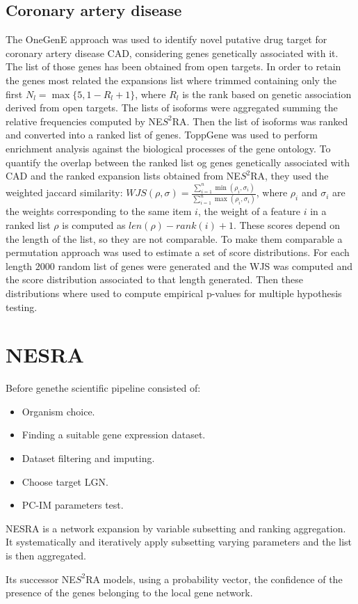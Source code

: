 	\subsection{Coronary artery disease}
	The OneGenE approach was used to identify novel putative drug target for coronary artery disease CAD, considering genes genetically associated with it.
	The list of those genes has been obtained from open targets.
	In order to retain the genes most related the expansions list where trimmed containing only the first $N_l=\max\{5, 1-R_l+1\}$, where $R_l$ is the rank based on genetic association derived from open targets.
	The lists of isoforms were aggregated summing the relative frequencies computed by NE$S^2$RA.
	Then the list of isoforms was ranked and converted into a ranked list of genes.
	ToppGene was used to perform enrichment analysis against the biological processes of the gene ontology.
	To quantify the overlap between the ranked list og genes genetically associated with CAD and the ranked expansion lists obtained from NE$S^2$RA, they used the weighted jaccard similarity: $WJS(\rho, \sigma) = \frac{\sum\limits_{i=1}^n\min(\rho_i, \sigma_i)}{\sum\limits_{i=1}^n\max(\rho_i, \sigma_i)}$, where $\rho_i$ and $\sigma_i$ are the weights corresponding to the same item $i$, the weight of a feature $i$ in a ranked list $\rho$ is computed as $len(\rho)-rank(i)+1$.
	These scores depend on the length of the list, so they are not comparable.
	To make them comparable a permutation approach was used to estimate a set of score distributions.
	For each length $2000$ random list of genes were generated and the WJS was computed and the score distribution associated to that length generated.
	Then these distributions where used to compute empirical p-values for multiple hypothesis testing.

\section{NESRA}
Before gene\@home the scientific pipeline consisted of:

\begin{multicols}{2}
	\begin{itemize}
		\item Organism choice.
		\item Finding a suitable gene expression dataset.
		\item Dataset filtering and imputing.
		\item Choose target LGN.
		\item PC-IM parameters test.
	\end{itemize}
\end{multicols}

NESRA is a network expansion by variable subsetting and ranking aggregation.
It systematically and iteratively apply subsetting varying parameters and the list is then aggregated.



Its successor NE$S^2$RA models, using a probability vector, the confidence of the presence of the genes belonging to the local gene network.
